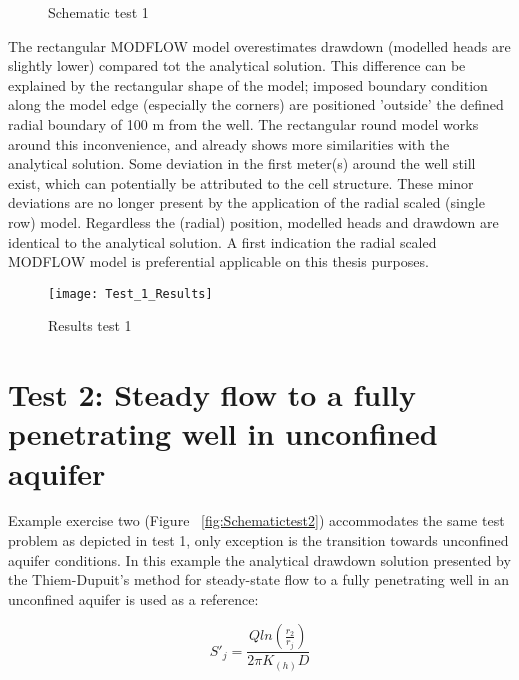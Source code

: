 \begin{figure}[h]
\centering
{}
\captionsetup{justification=centering}
\caption{Schematic test 1}
\label{fig:Schematictest1}
\end{figure}

The rectangular MODFLOW model overestimates drawdown (modelled heads are slightly lower) compared tot the analytical solution. This difference can be explained by the rectangular shape of the model; imposed boundary condition along the model edge (especially the corners) are positioned 'outside' the defined radial boundary of 100 m from the well. The rectangular round model works around this inconvenience, and already shows more similarities with the analytical solution. Some deviation in the first meter(s) around the well still exist, which can potentially be attributed to the cell structure. These minor deviations are no longer present by the application of the radial scaled (single row) model. Regardless the (radial) position, modelled heads and drawdown are identical to the analytical solution. A first indication the radial scaled MODFLOW model is preferential applicable on this thesis purposes.  

\begin{figure}[h!]
 \centering\texttt{[image: Test\_1\_Results]}
 \captionsetup{justification=centering}
 \caption{Results test 1}
 \label{fig:Test1_results}
\end{figure} 


\clearpage\section{Test 2: Steady flow to a fully penetrating well in unconfined aquifer}
Example exercise two (Figure ~\ref{fig:Schematictest2}) accommodates the same test problem as depicted in test 1, only exception is the transition towards unconfined aquifer conditions. In this example the analytical drawdown solution presented by the Thiem-Dupuit's method for steady-state flow to a fully penetrating well in an unconfined aquifer is used as a reference\citep{Kruseman2000}:

\begin{equation}
 S'_j = \frac{Q ln(\frac{r_{2}}{r_{j}})}{2\pi K_{(h)}D}
 \label{eq:thiem_unconfined}
 \end{equation} 
 
